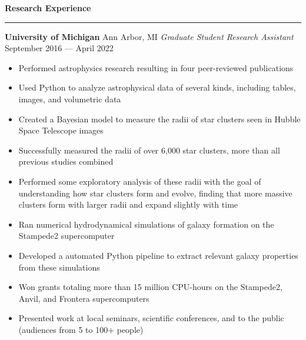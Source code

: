\documentclass[10pt]{article}
\newcommand{\header}[1]{\vspace{1.0em}\par \textbf{\large #1}\strut\hrule\vspace{-1.2em}}
\newcommand{\actionHeader}[2]{\vspace{1em}\textbf{#1} \hfill #2}
\newcommand{\actionHeaderSecondLine}[2]{\newline \textit{#1} \hfill #2}
\begin{document}
\header{Research Experience}
\actionHeader{University of Michigan}{Ann Arbor, MI}
\actionHeaderSecondLine{Graduate Student Research Assistant}{September 2016 --- April 2022}
\begin{itemize}
    \item Performed astrophysics research resulting in four peer-reviewed publications
    \item Used Python to analyze astrophysical data of several kinds, including tables, images, and volumetric data
    \item Created a Bayesian model to measure the radii of star clusters seen in Hubble Space Telescope images
    \item Successfully measured the radii of over 6,000 star clusters, more than all previous studies combined
    \item Performed some exploratory analysis of these radii with the goal of understanding how star clusters form and evolve, finding that more massive clusters form with larger radii and expand slightly with time
    \item Ran numerical hydrodynamical simulations of galaxy formation on the Stampede2 supercomputer
    \item Developed a automated Python pipeline to extract relevant galaxy properties from these simulations
    \item Won grants totaling more than 15 million CPU-hours on the Stampede2, Anvil, and Frontera supercomputers
    \item Presented work at local seminars, scientific conferences, and to the public (audiences from 5 to 100+ people)
\end{itemize}

\end{document}
